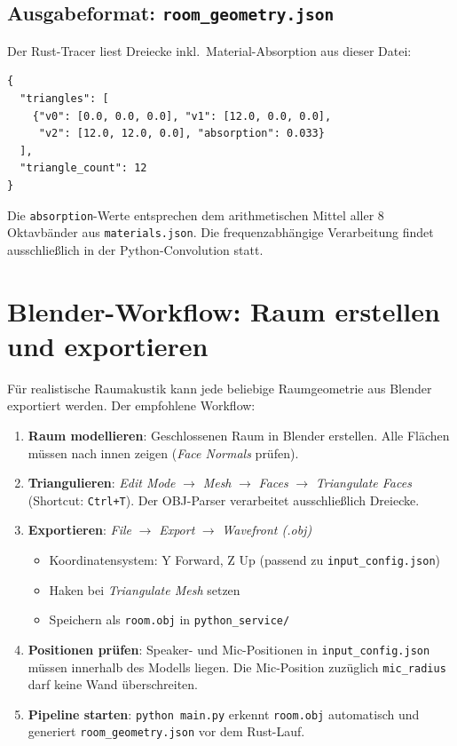 \documentclass[11pt,a4paper,twoside]{report}
\begin{document}
\subsection{Ausgabeformat: \texttt{room\_geometry.json}}

Der Rust-Tracer liest Dreiecke inkl.\ Material-Absorption aus dieser Datei:

\begin{lstlisting}[language={}]
{
  "triangles": [
    {"v0": [0.0, 0.0, 0.0], "v1": [12.0, 0.0, 0.0],
     "v2": [12.0, 12.0, 0.0], "absorption": 0.033}
  ],
  "triangle_count": 12
}
\end{lstlisting}

Die \texttt{absorption}-Werte entsprechen dem arithmetischen Mittel aller 8 Oktavb\"ander
aus \texttt{materials.json}. Die frequenzabh\"angige Verarbeitung findet ausschlie\ss{}lich
in der Python-Convolution statt.

\section{Blender-Workflow: Raum erstellen und exportieren}

F\"ur realistische Raumakustik kann jede beliebige Raumgeometrie aus Blender
exportiert werden. Der empfohlene Workflow:

\begin{enumerate}
    \item \textbf{Raum modellieren}: Geschlossenen Raum in Blender erstellen.
    Alle Fl\"achen m\"ussen nach innen zeigen (\textit{Face Normals} pr\"ufen).
    \item \textbf{Triangulieren}: \textit{Edit Mode} $\to$ \textit{Mesh} $\to$
    \textit{Faces} $\to$ \textit{Triangulate Faces} (Shortcut: \texttt{Ctrl+T}).
    Der OBJ-Parser verarbeitet ausschlie\ss{}lich Dreiecke.
    \item \textbf{Exportieren}: \textit{File} $\to$ \textit{Export} $\to$
    \textit{Wavefront (.obj)}
    \begin{itemize}
        \item Koordinatensystem: Y Forward, Z Up (passend zu \texttt{input\_config.json})
        \item Haken bei \textit{Triangulate Mesh} setzen
        \item Speichern als \texttt{room.obj} in \texttt{python\_service/}
    \end{itemize}
    \item \textbf{Positionen pr\"ufen}: Speaker- und Mic-Positionen in
    \texttt{input\_config.json} m\"ussen innerhalb des Modells liegen.
    Die Mic-Position zuz\"uglich \texttt{mic\_radius} darf keine Wand \"uberschreiten.
    \item \textbf{Pipeline starten}: \texttt{python main.py} erkennt \texttt{room.obj}
    automatisch und generiert \texttt{room\_geometry.json} vor dem Rust-Lauf.
\end{enumerate}
\end{document}
